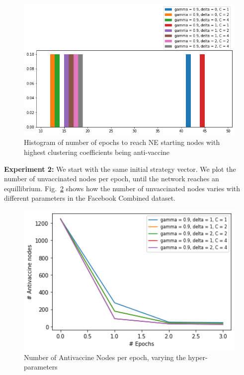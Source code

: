\begin{figure}[H]
    \centering
    \includegraphics[width=14cm]{figs/exp1-diff-params-clusters.png}
    \caption{Histogram of number of epochs to reach NE starting nodes with highest clustering coefficients being anti-vaccine}
    \label{fig:exp1-diff-params-cluster}
\end{figure}



\noindent
\textbf{Experiment 2:} We start with the same initial strategy vector. We plot the number of unvaccinated nodes per epoch, until the network reaches an equillibrium. Fig.~\ref{fig:antivax_epoch} shows how the number of unvaccinated nodes varies with different parameters in the Facebook Combined dataset.

\begin{figure}[H]
    \centering
    \includegraphics[width=12cm]{figs/exp1-random.png}
    \caption{Number of Antivaccine Nodes per epoch, varying the hyper-parameters}
    \label{fig:antivax_epoch}
\end{figure}


